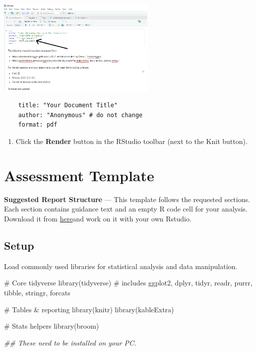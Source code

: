 \documentclass[
  letterpaper,
  DIV=11,
  numbers=noendperiod]{scrreprt}
\newenvironment{Shaded}{\begin{snugshade}}{\end{snugshade}}
\newcommand{\CommentTok}[1]{\textcolor[rgb]{0.37,0.37,0.37}{#1}}
\newcommand{\DocumentationTok}[1]{\textcolor[rgb]{0.37,0.37,0.37}{\textit{#1}}}
\newcommand{\FunctionTok}[1]{\textcolor[rgb]{0.28,0.35,0.67}{#1}}
\newcommand{\NormalTok}[1]{\textcolor[rgb]{0.00,0.23,0.31}{#1}}
\providecommand{\tightlist}{%
  \setlength{\itemsep}{0pt}\setlength{\parskip}{0pt}}\usepackage{longtable,booktabs,array}
\begin{document}
\includegraphics[width=3.01in,height=\textheight,keepaspectratio]{general/../img/quartoHeader.png}

\begin{verbatim}
    title: "Your Document Title"
    author: "Anonymous" # do not change
    format: pdf
\end{verbatim}

\begin{enumerate}
\def\labelenumi{\arabic{enumi}.}
\setcounter{enumi}{4}
\tightlist
\item
  Click the \textbf{Render} button in the RStudio toolbar (next to the
  Knit button).
\end{enumerate}


\chapter*{Assessment Template}\label{assessment-template}


\textbf{Suggested Report Structure} --- This template follows the
requested sections. Each section contains guidance text and an empty R
code cell for your analysis. Download it from
\href{https://raw.githubusercontent.com/GDSL-UL/stats/main/general/reportTemplate.qmd}{here}and
work on it with your own Rstudio.

\section*{Setup}\label{setup}


Load commonly used libraries for statistical analysis and data
manipulation.

\begin{Shaded}
\begin{Highlighting}[]
\CommentTok{\# Core tidyverse}
\FunctionTok{library}\NormalTok{(tidyverse)    }\CommentTok{\# includes ggplot2, dplyr, tidyr, readr, purrr, tibble, stringr, forcats}

\CommentTok{\# Tables \& reporting}
\FunctionTok{library}\NormalTok{(knitr)}
\FunctionTok{library}\NormalTok{(kableExtra)}

\CommentTok{\# Stats helpers}
\FunctionTok{library}\NormalTok{(broom)}

\DocumentationTok{\#\# These need to be installed on your PC.}
\end{Highlighting}
\end{Shaded}
\end{document}
